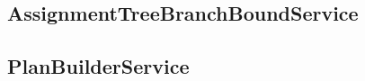 \subsection{AssignmentTreeBranchBoundService}\label{assignmenttreebranchboundservice}

\subsection{PlanBuilderService}\label{planbuilderservice}
